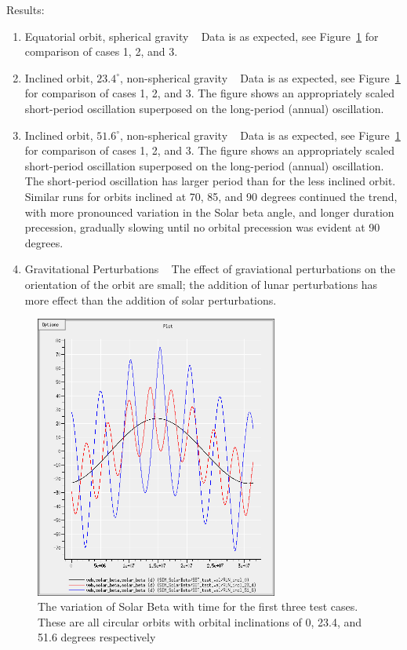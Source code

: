 \begin{description}
\begin{enumerate}
\end{enumerate}

\item{Results:}
\begin{enumerate}
 \item {Equatorial orbit, spherical gravity} \ \newline
Data is as expected, see Figure~\ref{fig:solbeta123} for comparison of cases 1, 2, and 3.
\item {Inclined orbit, $23.4^\circ$, non-spherical gravity} \ \newline
Data is as expected, see Figure~\ref{fig:solbeta123} for comparison of cases 1, 2, and 3.  The figure shows an appropriately scaled short-period oscillation superposed on the long-period (annual) oscillation.
\item {Inclined orbit, $51.6^\circ$, non-spherical gravity} \ \newline
Data is as expected, see Figure~\ref{fig:solbeta123} for comparison of cases 1, 2, and 3.  The figure shows an appropriately scaled short-period oscillation superposed on the long-period (annual) oscillation.  The short-period oscillation has larger period than for the less inclined orbit.  Similar runs for orbits inclined at 70, 85, and 90 degrees continued the trend, with more pronounced variation in the Solar beta angle, and longer duration precession, gradually slowing until no orbital precession was evident at 90 degrees.
\item{Gravitational Perturbations} \ \newline
The effect of graviational perturbations on the orientation of the orbit are small; the addition of lunar perturbations has more effect than the addition of solar perturbations.
\end{enumerate}
\end{description}

\begin{figure}[!ht]
  \begin{center}
        \includegraphics[width=80mm]{figures/solbeta123.jpg}
        \caption{The variation of Solar Beta with time for the first three test cases.  These are all circular orbits with orbital inclinations of 0, 23.4, and 51.6 degrees respectively} 
        \label{fig:solbeta123}
  \end{center}
\end{figure}
